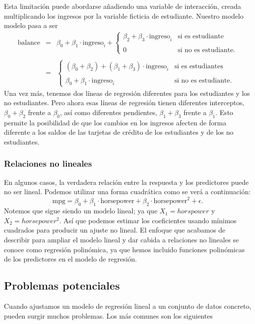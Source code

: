 Esta limitación puede abordarse añadiendo una variable de interacción, creada multiplicando los ingresos por la variable ficticia de estudiante. Nuestro modelo modelo pasa a ser
$$
\begin{array}{rcl}
    \mbox{balance} &=& \beta_0+\beta_1\cdot \mbox{ingreso}_i + 
	\left\{
	\begin{array}{ll} 
	    \beta_2 +\beta_3\cdot \mbox{ingreso}_i& \mbox{si es estudiante}\\\\
	    0 & \mbox{si no es estudiante.}
	\end{array}
	\right.\\\\
	&=&
	\left\{
	\begin{array}{ll}
	    (\beta_0+\beta_2)+(\beta_1+\beta_3)\cdot \mbox{ingreso}_i & \mbox{si es estudiantes}\\\\
	    \beta_0+\beta_1\cdot \mbox{ingreso}_i & \mbox{si no es estudiante.}
	\end{array}
	\right.
\end{array}
$$
Una vez más, tenemos dos líneas de regresión diferentes para los estudiantes y los no estudiantes. Pero ahora esas líneas de regresión tienen diferentes interceptos, $\beta_0 +\beta_2$ frente a $\beta_0$, así como diferentes pendientes, $\beta_1 +\beta_3$ frente a $\beta_1$. Esto permite la posibilidad de que los cambios en los ingresos afecten de forma diferente a los saldos de las tarjetas de crédito de los estudiantes y de los no estudiantes.


\subsubsection{Relaciones no lineales}
En algunos casos, la verdadera relación entre la respuesta y los predictores puede no ser lineal. Podemos utilizar una forma cuadrática como se verá a continuación: 
$$\mbox{mpg}=\beta_0+\beta_1\cdot \mbox{horsepower}+\beta_2\cdot \mbox{horsepower}^2+\epsilon.$$
Notemos que sigue siendo un modelo lineal; ya que $X_1=horspower$ y $X_2=horsepower^2$. Así que podemos estimar los coeficientes usando mínimos cuadrados para producir un ajuste no lineal. El enfoque que acabamos de describir para ampliar el modelo lineal y dar cabida a relaciones no lineales se conoce como regresión polinómica, ya que hemos incluido funciones polinómicas de los predictores en el modelo de regresión.

\subsection{Problemas potenciales}
Cuando ajustamos un modelo de regresión lineal a un conjunto de datos concreto, pueden surgir muchos problemas. Los más comunes son los siguientes

